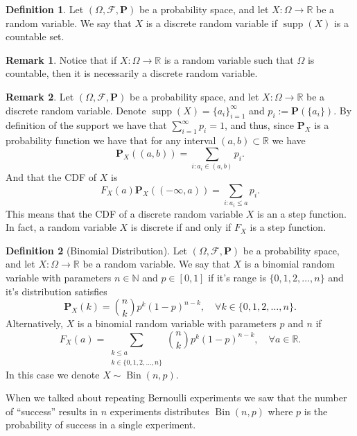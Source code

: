 \documentclass[11pt,a4paper]{article}
\theoremstyle{definition}
\newtheorem{definition}{Definition}[section]
\newtheorem{remark}{Remark}[section]
\theoremstyle{plain}
\DeclareMathOperator{\supp}{supp}
\DeclareMathOperator{\Bin}{Bin}
\newcommand{\N}{\mathbb{N}}
\newcommand{\R}{\mathbb{R}}
\begin{document}
  \begin{definition}
    Let $(\Omega ,\mathcal F, \mathbf P)$ be a probability space,
    and let $X \colon \Omega \to \R$ be a random variable.
    We say that $X$ is a discrete random variable if $\supp(X)$ is a 
    countable set.
  \end{definition}
  \begin{remark}
    Notice that if $X \colon \Omega \to \R$ is a random variable such
    that $\Omega$ is countable, then it is necessarily a discrete random
    variable.
  \end{remark}
  \begin{remark}
    Let $(\Omega ,\mathcal F, \mathbf P)$ be a probability space,
    and let $X \colon \Omega \to \R$ be a discrete random variable.
    Denote $\supp(X) = \{a_i\}_{i=1}^{\infty}$ and $p_i := \mathbf P(\{a_i\})$.
    By definition of the support we have that $\sum_{i=1}^{\infty} p_i = 1$,
    and thus, since $\mathbf P_X$ is a probability function we have that
    for any interval $(a,b) \subset \R$ we have
    \[
      \mathbf P_X \left((a,b)\right) = \sum_{i \colon a_i \in (a,b)} p_i.
    \]
    And that the CDF of $X$ is
    \[
      F_X(a)
      \mathbf P_X \left((-\infty,a)\right) = \sum_{i \colon a_i \le a} p_i.
    \]
    This means that the CDF of a discrete random variable $X$ is an a step
    function. In fact, a random variable $X$ is discrete if and only if
    $F_X$ is a step function.
  \end{remark}

  \begin{definition}[Binomial Distribution]
    Let $(\Omega ,\mathcal F, \mathbf P)$ be a probability space,
    and let $X \colon \Omega \to \R$ be a random variable.
    We say that $X$ is a binomial random variable with parameters
    $n \in \N$ and $p \in [0,1]$ if it's range is $\{0,1,2,\dots,n\}$ and
    it's distribution satisfies
    \[
      \mathbf P_X(k) = \binom{n}{k} p^k (1-p)^{n-k}, \quad 
      \forall k \in \{0,1,2,\dots,n\}.
    \]
    Alternatively, $X$ is a binomial random variable with parameters
    $p$ and $n$ if
    \[
      F_X(a) = \sum_{\substack{k \le a \\ k \in \{0,1,2,\dots,n\}}}
      \binom{n}{k} p^k (1-p)^{n-k}, \quad \forall a \in \R.
    \]
    In this case we denote $X \sim \Bin(n,p)$.
  \end{definition}
  When we talked about repeating Bernoulli experiments we saw that the number
  of ``success'' results in $n$ experiments distributes $\Bin(n,p)$ where
  $p$ is the probability of success in a single experiment.
  
\end{document}
